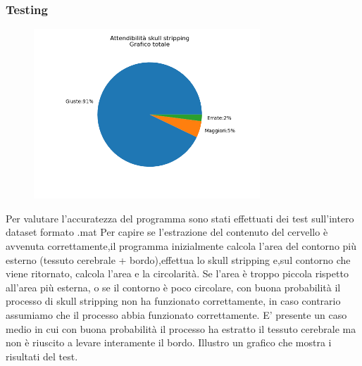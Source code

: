 \documentclass{article}
\begin{document}
\subsubsection{Testing}


\begin{figure}
    \includegraphics[width=8.5cm]{images/ss.png}
\end{figure}

Per valutare l'accuratezza del programma sono stati effettuati dei test sull'intero dataset formato .mat
Per capire se l'estrazione del contenuto del cervello è avvenuta correttamente,il programma inizialmente calcola l'area del contorno più esterno (tessuto cerebrale + bordo),effettua lo skull stripping e,sul contorno che viene ritornato, calcola l'area e la circolarità.
Se l'area è troppo piccola rispetto all'area più esterna, o se il contorno è poco circolare, con buona probabilità il processo di skull stripping non ha funzionato correttamente, in caso contrario assumiamo che il processo abbia funzionato correttamente.
E' presente un caso medio in cui con buona probabilità il processo ha estratto il tessuto cerebrale ma non è riuscito a levare interamente il bordo.
Illustro un grafico che mostra i risultati del test.
\end{document}
